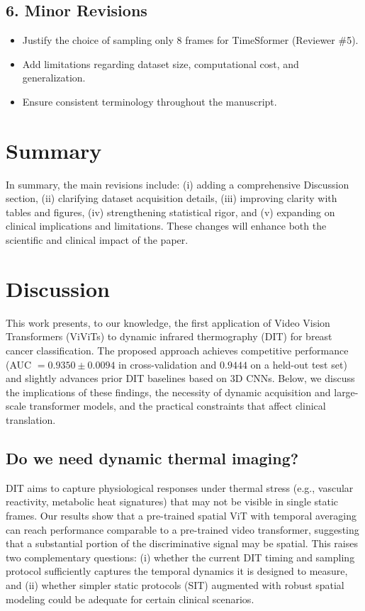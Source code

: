 \subsection*{6. Minor Revisions}
\begin{itemize}
    \item Justify the choice of sampling only 8 frames for TimeSformer (Reviewer \#5).
    \item Add limitations regarding dataset size, computational cost, and generalization.
    \item Ensure consistent terminology throughout the manuscript.
\end{itemize}

\section*{Summary}
In summary, the main revisions include: (i) adding a comprehensive
Discussion section, (ii) clarifying dataset acquisition details, (iii)
improving clarity with tables and figures, (iv) strengthening
statistical rigor, and (v) expanding on clinical implications and
limitations. These changes will enhance both the scientific and
clinical impact of the paper.

\section{Discussion}

This work presents, to our knowledge, the first application of Video
Vision Transformers (ViViTs) to dynamic infrared thermography (DIT)
for breast cancer classification. The proposed approach achieves
competitive performance (AUC $=0.9350 \pm 0.0094$ in cross-validation
and $0.9444$ on a held-out test set) and slightly advances prior DIT
baselines based on 3D CNNs. Below, we discuss the implications of
these findings, the necessity of dynamic acquisition and large-scale
transformer models, and the practical constraints that affect clinical
translation.

\subsection{Do we need dynamic thermal imaging?}
DIT aims to capture physiological responses under thermal stress
(e.g., vascular reactivity, metabolic heat signatures) that may not be
visible in single static frames. Our results show that a pre-trained
spatial ViT with temporal averaging can reach performance comparable
to a pre-trained video transformer, suggesting that a substantial
portion of the discriminative signal may be spatial. This raises two
complementary questions: (i) whether the current DIT timing and
sampling protocol sufficiently captures the temporal dynamics it is
designed to measure, and (ii) whether simpler static protocols (SIT)
augmented with robust spatial modeling could be adequate for certain
clinical scenarios.

